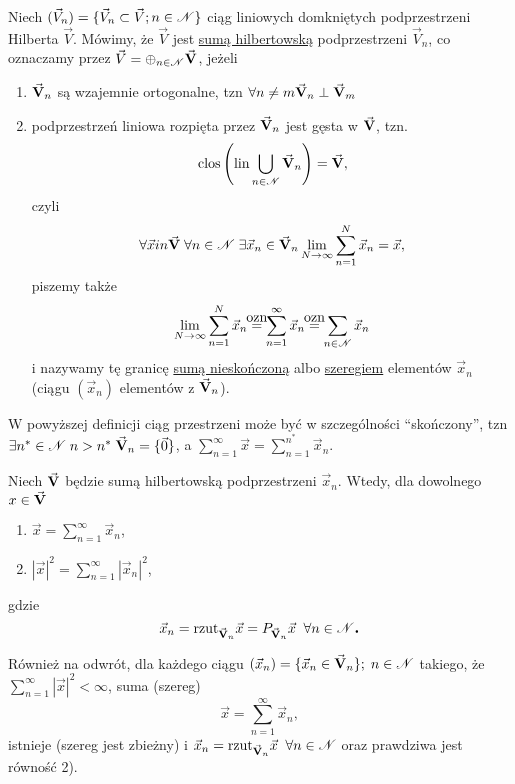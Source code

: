 \begin{mydef}
   Niech $(\vec{V}_n) = \{\vec{V}_n \subset \vec{V}; n \in \mathscr{N}\}$ ciąg liniowych domkniętych podprzestrzeni Hilberta $\vec{V}$. Mówimy, że $\vec{V}$ jest \underline{sumą hilbertowską} podprzestrzeni $\vec{V}_n$, co oznaczamy przez $\vec{V} = \oplus_{n\in\mathscr{N}} \vec{\mathbf{V}}$, jeżeli
   \begin{enumerate}
    \item $\vec{\mathbf{V}}_n$ są wzajemnie ortogonalne, tzn $\forall n\neq m \vec{\mathbf{V}}_n \perp \vec{\mathbf{V}}_m$
    \item podprzestrzeń liniowa rozpięta przez $\vec{\mathbf{V}}_n$ jest gęsta w $\vec{\mathbf{V}}$, tzn.
   \[\,\textnormal{clos} \left(\normalfont\mbox{lin} \bigcup\limits_{n \in \mathscr{N}} \vec{\mathbf{V}}_n\right) = \vec{\mathbf{V}},
   \]
    czyli
    \[\forall \vec{x} in \vec{\mathbf{V}}\; \forall n \in \mathscr{N} \; \exists \vec{x}_n \in \vec{\mathbf{V}}_n \lim\limits_{N\to\infty} \sum\limits_{n=1}^N \vec{x}_n = \vec{x},\]
    piszemy także
    \[\lim\limits_{N\to\infty} \sum\limits_{n=1}^N \vec{x}_n \ozn \sum\limits_{n=1}^{\infty} \vec{x}_n \ozn \sum\limits_{n\in\nat}\vec{x}_n\]
    i nazywamy tę granicę \underline{sumą nieskończoną} albo \underline{szeregiem} elementów $\vec{x}_n$ (ciągu $(\vec{x}_n)$ elementów z $\vec{\mathbf{V}}_n$).
   \end{enumerate}
\end{mydef}

\begin{info}
   W powyższej definicji ciąg przestrzeni może być w szczególności ``skończony'', tzn $\exists n^* \in \mathscr{N} \; n > n^* \; \vec{\mathbf{V}}_n = \{\vec{0}\}$, a $\sum\limits_{n=1}^{\infty} \vec{x} = \sum\limits_{n=1}^{n^*} \vec{x}_n$.
\end{info}

\begin{tw}
   Niech $\vec{\mathbf{V}}$ będzie sumą hilbertowską podprzestrzeni $\vec{x}_n$. Wtedy, dla dowolnego $x \in \vec{\mathbf{V}}$
   \begin{enumerate}
    \item $\vec{x} = \sum\limits_{n=1}^{\infty} \vec{x}_n$,
    \item $|\vec{x}|^2 = \sum\limits_{n=1}^{\infty} |\vec{x}_n|^2$,
   \end{enumerate}
   gdzie 
   \[\vec{x}_n = \normalfont\mbox{rzut}_{\vec{\mathbf{V}}_n} \vec{x} = P_{\vec{\mathbf{V}}_n} \vec{x} \;\; \forall n \in \mathscr{N} \mbox{\large\bfseries .}\]

   Również na odwrót, dla każdego ciągu $(\vec{x}_n) = \{\vec{x}_n \in \vec{\mathbf{V}}_n\}; \; n \in \mathscr{N}$ takiego, że $\sum\limits_{n=1}^{\infty} |\vec{x}|^2 < \infty$, suma (szereg)
   \[\vec{x} = \sum\limits_{n=1}^{\infty} \vec{x}_n,\]
   istnieje (szereg jest zbieżny) i $\vec{x}_n = \normalfont\mbox{rzut}_{\vec{\mathbf{V}}_n} \vec{x}\;\; \forall n \in \mathscr{N}$ oraz prawdziwa jest równość 2).
\end{tw}
